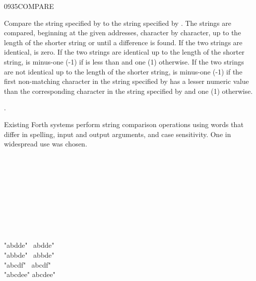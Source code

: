 \begin{worddef}{0935}{COMPARE}
\item {}

	Compare the string specified by  to the
	string specified by . The strings are
	compared, beginning at the given addresses, character by
	character, up to the length of the shorter string or until a
	difference is found. If the two strings are identical, 
	is zero. If the two strings are identical up to the length of
	the shorter string,  is minus-one (-1) if 
	is less than  and one (1) otherwise. If the two
	strings are not identical up to the length of the shorter string,
	 is minus-one (-1) if the first non-matching character
	in the string specified by  has a lesser
	numeric value than the corresponding character in the string
	specified by  and one (1) otherwise.

\see {}.

	\begin{rationale} %
		Existing Forth systems perform string comparison operations
		using words that differ in spelling, input and output
		arguments, and case sensitivity. One in widespread use
		was chosen.
	\end{rationale}

	\begin{testing}\ttfamily
		 \\
		 \tab {}  \\
		 \\
		 \\
		 \\
		 \\
		 \\
		 \\

		\word{:} "abdde"~  abdde"~ \word{;} \\
		\word{:} "abbde"~  abbde"~ \word{;} \\
		\word{:} "abcdf"~  abcdf"~ \word{;} \\
		\word{:} "abcdee"  abcdee" \word{;}


\end{testing}
\end{worddef}
